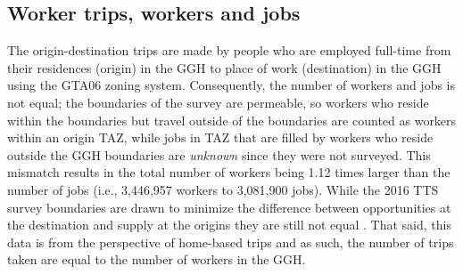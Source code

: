 \documentclass[Royal,times,sageh]{sagej}
\begin{document}
\hypertarget{worker-trips-workers-and-jobs}{%
\subsection{Worker trips, workers and
jobs}\label{worker-trips-workers-and-jobs}}

The origin-destination trips are made by people who are employed
full-time from their residences (origin) in the GGH to place of work
(destination) in the GGH using the GTA06 zoning system. Consequently,
the number of workers and jobs is not equal; the boundaries of the
survey are permeable, so workers who reside within the boundaries but
travel outside of the boundaries are counted as workers within an origin
TAZ, while jobs in TAZ that are filled by workers who reside outside the
GGH boundaries are \emph{unknown} since they were not surveyed. This
mismatch results in the total number of workers being 1.12 times larger
than the number of jobs (i.e., 3,446,957 workers to 3,081,900 jobs).
While the 2016 TTS survey boundaries are drawn to minimize the
difference between opportunities at the destination and supply at the
origins they are still not equal . That said, this data is from the
perspective of home-based trips and as such, the number of trips taken
are equal to the number of workers in the GGH.
\end{document}
